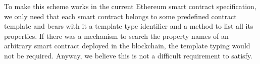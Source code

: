 To make this scheme works in the current Ethereum smart contract specification, we only need that each smart contract belongs to some predefined contract template and bears with it a template type identifier and a method to list all its properties. If there was a mechanism to search the property names of an arbitrary smart contract deployed in the blockchain, the template typing would not be required. Anyway, we believe this is not a difficult requirement to satisfy.   
   
\begin{figure}[t!]
\scriptsize
\begin{bnf*}
 { \bnfor \bnfes}\\
\\
\\
\\
\\
\\
\\
\\
\\
\\
\\
\\
\\
\\
\\

\end{bnf*}
\end{figure}
